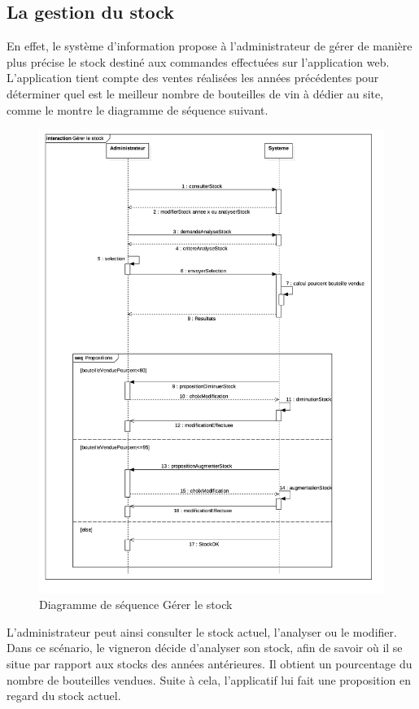 \documentclass[a4paper, titlepage]{report}
\begin{document}
\subsection{La gestion du stock}\label{la-gestion-du-stock}

En effet, le système d'information propose à l'administrateur de gérer
de manière plus précise le stock destiné aux commandes effectuées sur
l'application web. L'application tient compte des ventes réalisées les
années précédentes pour déterminer quel est le meilleur nombre de
bouteilles de vin à dédier au site, comme le montre le diagramme de
séquence suivant.

\clearpage
\begin{figure}[!h]
\centering
\includegraphics{Images/SequenceDiagramGererStock.jpg}
\caption{Diagramme de séquence Gérer le stock}
\end{figure}

L'administrateur peut ainsi consulter le stock actuel, l'analyser ou le
modifier. Dans ce scénario, le vigneron décide d'analyser son stock,
afin de savoir où il se situe par rapport aux stocks des années
antérieures. Il obtient un pourcentage du nombre de bouteilles vendues.
Suite à cela, l'applicatif lui fait une proposition en regard du stock
actuel.
\end{document}
